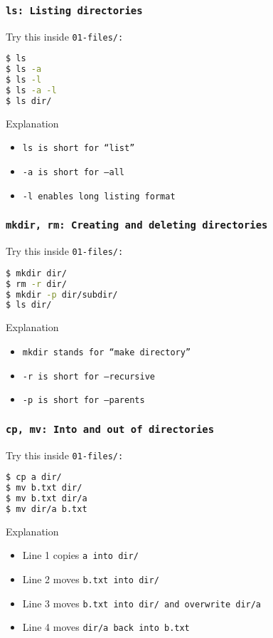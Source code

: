 \begin{frame}[fragile]
\frametitle{\tt{ls}: Listing directories}
Try this inside \tt{01-files/}:
\begin{lstlisting}[language=bash]
$ ls
$ ls -a
$ ls -l
$ ls -a -l
$ ls dir/
\end{lstlisting}
\begin{block}{Explanation}
    \begin{itemize}
        \item \tt{ls} is short for ``list''
        \item \tt{-a} is short for \tt{--all}
        \item \tt{-l} enables long listing format
    \end{itemize}
\end{block}
\end{frame}

\begin{frame}[fragile]
\frametitle{\tt{mkdir, rm}: Creating and deleting directories}
Try this inside \tt{01-files/}:
\begin{lstlisting}[language=bash]
$ mkdir dir/
$ rm -r dir/
$ mkdir -p dir/subdir/
$ ls dir/
\end{lstlisting}
\begin{block}{Explanation}
    \begin{itemize}
        \item \tt{mkdir} stands for ``make directory''
        \item \tt{-r} is short for \tt{--recursive}
        \item \tt{-p} is short for \tt{--parents}
    \end{itemize}
\end{block}
\end{frame}

\begin{frame}[fragile]
\frametitle{\tt{cp, mv}: Into and out of directories}
Try this inside \tt{01-files/}:
\begin{lstlisting}[language=bash]
$ cp a dir/
$ mv b.txt dir/
$ mv b.txt dir/a
$ mv dir/a b.txt
\end{lstlisting}
\begin{block}{Explanation}
    \begin{itemize}
        \item Line 1 copies \tt{a} into \tt{dir/}
        \item Line 2 moves \tt{b.txt} into \tt{dir/}
        \item Line 3 moves \tt{b.txt} into \tt{dir/} and overwrite
            \tt{dir/a}
        \item Line 4 moves \tt{dir/a} back into \tt{b.txt}
    \end{itemize}
\end{block}
\end{frame}


